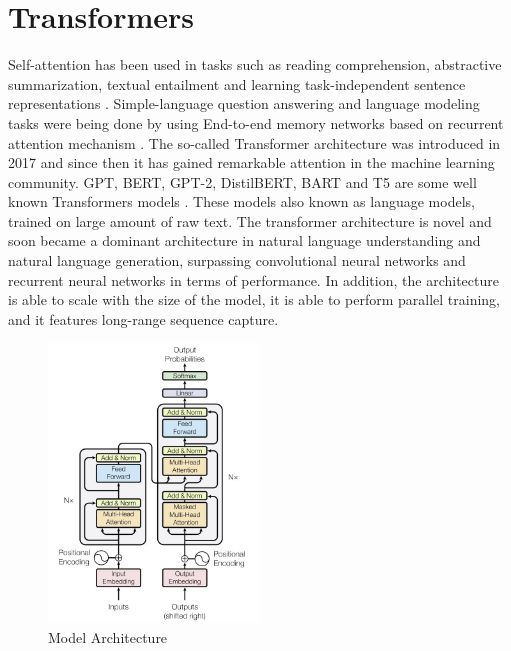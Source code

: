 
\section{Transformers}

Self-attention has been used in tasks such as reading comprehension, abstractive summarization, textual entailment and learning task-independent sentence representations \cite{cheng2016longshorttermmemory, parikh2016decomposable, paulus2017deep, lin2017structured}. Simple-language question answering and language modeling tasks were being done by using End-to-end memory networks based on recurrent attention mechanism \cite{sukhbaatar2015end}. The so-called Transformer architecture was introduced in 2017 \cite{vaswani2017attention} and since then it has gained remarkable attention in the machine learning community. GPT, BERT, GPT-2, DistilBERT, BART and T5 are some well known Transformers models \cite{radford2018improving, devlin2018bert, GPT_2, DistilBERT, T5}. These models also known as language models, trained on large amount of raw text. The transformer architecture is novel and soon became a dominant architecture in natural language understanding and natural language generation, surpassing convolutional neural networks and recurrent neural networks in terms of performance. In addition, the architecture is able to scale with the size of the model, it is able to perform parallel training, and it features long-range sequence capture.

\begin{figure}[!ht]
    \centering
    \includegraphics[width=0.5\textwidth]{chapters/images/Transformer/Architecture.JPG}
    \caption{Model Architecture\cite{vaswani2017attention}}
    \label{fig:Model_Architecture}
\end{figure}

